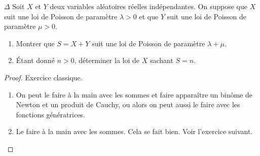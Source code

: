 \documentclass[french,a4paper]{article}
\theoremstyle{plain}
\theoremstyle{definition}
\theoremstyle{remark}
\begin{document}
\begin{ex}[Moulin.48]{$\Delta$}
	Soit $X$ et $Y$ deux variables aléatoires réelles indépendantes. On suppose que $X$ suit une loi de Poisson de paramètre $\lambda>0$ et que $Y$ suit une loi de Poisson de paramètre $\mu>0$.
	\begin{enumerate}
		\item Montrer que $S=X+Y$ suit une loi de Poisson de paramètre $\lambda+\mu$.
		\item Étant donné $n>0$, déterminer la loi de $X$ sachant $S=n$.
	\end{enumerate}
\end{ex}
\begin{proof}
	Exercice classique.
	\begin{enumerate}
		\item On peut le faire à la main avec les sommes et faire apparaître un binôme de Newton et un produit de Cauchy, ou alors on peut aussi le faire avec les fonctions génératrices.
		\item Le faire à la main avec les sommes. Cela se fait bien. Voir l'exercice suivant.
	\end{enumerate}
\end{proof}
\end{document}
